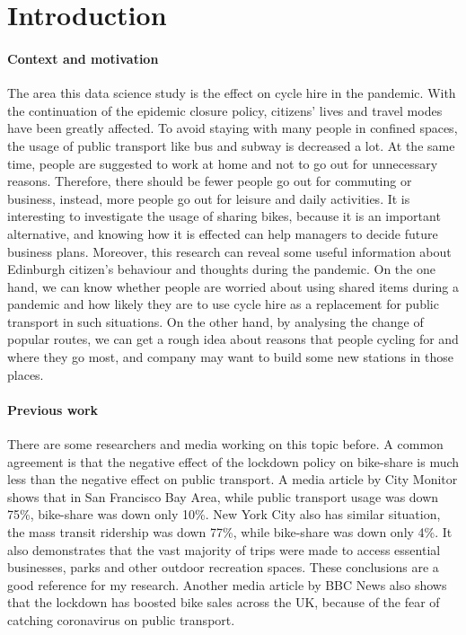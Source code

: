 \documentclass[11pt,a4paper]{article}
\begin{document}
\section{Introduction}

\paragraph{Context and motivation}


The area this data science study is the effect on cycle hire in the pandemic. With the continuation of the epidemic closure policy, citizens' lives and travel modes have been greatly affected. To avoid staying with many people in confined spaces, the usage of public transport like bus and subway is decreased a lot. At the same time, people are suggested to work at home and not to go out for unnecessary reasons. Therefore, there should be fewer people go out for commuting or business, instead, more people go out for leisure and daily activities. It is interesting to investigate the usage of sharing bikes, because it is an important alternative, and knowing how it is effected can help managers to decide future business plans. Moreover, this research can reveal some useful information about Edinburgh citizen’s behaviour and thoughts during the pandemic. On the one hand, we can know whether people are worried about using shared items during a pandemic and how likely they are to use cycle hire as a replacement for public transport in such situations. On the other hand, by analysing the change of popular routes, we can get a rough idea about reasons that people cycling for and where they go most, and company may want to build some new stations in those places. 

\paragraph{Previous work}


There are some researchers and media working on this topic before. A common agreement is that the negative effect of the lockdown policy on bike-share is much less than the negative effect on public transport. A media article by City Monitor \cite{bike-share1} shows that in San Francisco Bay Area, while public transport usage was down 75\%, bike-share was down only 10\%. New York City also has similar situation, the mass transit ridership was down 77\%, while bike-share was down only 4\%. It also demonstrates that the vast majority of trips were made to access essential businesses, parks and other outdoor recreation spaces. These conclusions are a good reference for my research. Another media article by BBC News \cite{bike-share2} also shows that the lockdown has boosted bike sales across the UK, because of the fear of catching coronavirus on public transport.
\end{document}
